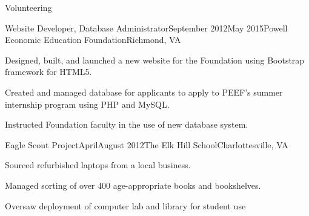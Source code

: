 \documentclass{resume} %
\begin{document}
\begin{rSection}{Volunteering}

\begin{rSubsection}{Website Developer, Database Administrator}{September 2012\textminus May 2015}{Powell Economic Education Foundation}{Richmond, VA}
\item Designed, built, and launched a new website for the Foundation using Bootstrap framework for HTML5.
\item Created and managed database for applicants to apply to PEEF's summer internship program using PHP and MySQL.
\item Instructed Foundation faculty in the use of new database system.
\end{rSubsection}
\begin{rSubsection}{Eagle Scout Project}{April\textminus August 2012}{The Elk Hill School}{Charlottesville, VA}
\item Sourced refurbished laptops from a local business.
\item Managed sorting of over 400 age-appropriate books and bookshelves.
\item Oversaw deployment of computer lab and library for student use
\end{rSubsection}
\end{rSection}











\end{document}
